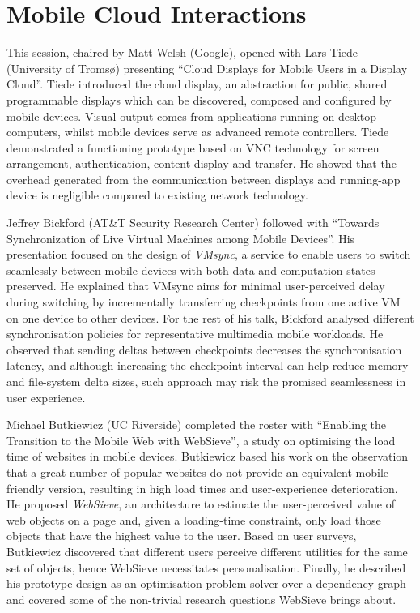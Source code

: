 \section{Mobile Cloud Interactions}
\label{sec:mobilecloud}

This session, chaired by Matt Welsh (Google), opened with Lars Tiede
(University of Tromsø) presenting ``Cloud Displays for Mobile Users in a
Display Cloud''. Tiede introduced the cloud display, an abstraction for
public, shared programmable displays which can be discovered, composed
and configured by mobile devices. Visual output comes from
applications running on desktop computers, whilst mobile devices serve as
advanced remote controllers. Tiede demonstrated a functioning
prototype based on VNC technology for screen arrangement,
authentication, content display and transfer. He showed that the
overhead generated from the communication between displays and
running-app device is negligible compared to existing network
technology.

Jeffrey Bickford (AT\&T Security Research Center) followed with
``Towards Synchronization of Live Virtual Machines among Mobile
Devices''. His presentation focused on the design of \emph{VMsync}, a
service to enable users to switch seamlessly between mobile devices
with both data and computation states preserved. He explained that VMsync
aims for minimal user-perceived delay during switching by incrementally
transferring checkpoints from one active VM on one device to other
devices. For the rest of his talk, Bickford analysed different
synchronisation policies for representative multimedia mobile workloads.
He observed that sending deltas between checkpoints decreases the
synchronisation latency, and although increasing the checkpoint interval
can help reduce memory and file-system delta sizes, such approach may
risk the promised seamlessness in user experience.

Michael Butkiewicz (UC Riverside) completed the roster with ``Enabling
the Transition to the Mobile Web with WebSieve'', a study on optimising
the load time of websites in mobile devices. Butkiewicz based his work
on the observation that a great number of popular websites do
not provide an equivalent mobile-friendly version, resulting in high
load times and user-experience deterioration. He proposed
\emph{WebSieve}, an architecture to estimate the user-perceived value of
web objects on a page and, given a loading-time constraint, only load 
those objects that have the highest value to the user. Based on user
surveys, Butkiewicz discovered that different users perceive different
utilities for the same set of objects, hence WebSieve necessitates
personalisation.  Finally, he described his prototype design as an
optimisation-problem solver over a dependency graph and covered
some of the non-trivial research questions WebSieve brings about.
